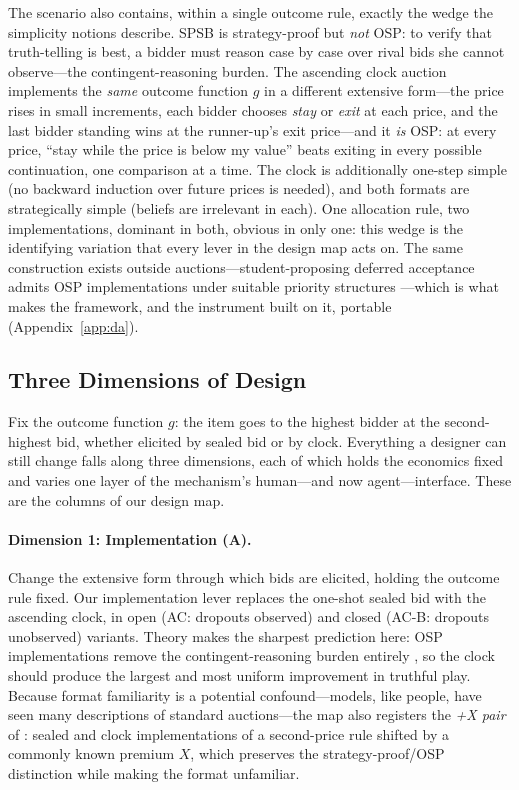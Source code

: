 The scenario also contains, within a single outcome rule, exactly the wedge the simplicity notions describe. SPSB is strategy-proof but \emph{not} OSP: to verify that truth-telling is best, a bidder must reason case by case over rival bids she cannot observe---the contingent-reasoning burden. The ascending clock auction implements the \emph{same} outcome function $g$ in a different extensive form---the price rises in small increments, each bidder chooses \emph{stay} or \emph{exit} at each price, and the last bidder standing wins at the runner-up's exit price---and it \emph{is} OSP: at every price, ``stay while the price is below my value'' beats exiting in every possible continuation, one comparison at a time. The clock is additionally one-step simple (no backward induction over future prices is needed), and both formats are strategically simple (beliefs are irrelevant in each). One allocation rule, two implementations, dominant in both, obvious in only one: this wedge is the identifying variation that every lever in the design map acts on. The same construction exists outside auctions---student-proposing deferred acceptance admits OSP implementations under suitable priority structures \citep{ashlagi2018stable}---which is what makes the framework, and the instrument built on it, portable (Appendix~\ref{app:da}).

\subsection{Three Dimensions of Design}\label{sec:theory-levers}

Fix the outcome function $g$: the item goes to the highest bidder at the second-highest bid, whether elicited by sealed bid or by clock. Everything a designer can still change falls along three dimensions, each of which holds the economics fixed and varies one layer of the mechanism's human---and now agent---interface. These are the columns of our design map.

\paragraph{Dimension 1: Implementation (A).}
Change the extensive form through which bids are elicited, holding the outcome rule fixed. Our implementation lever replaces the one-shot sealed bid with the ascending clock, in open (AC: dropouts observed) and closed (AC-B: dropouts unobserved) variants. Theory makes the sharpest prediction here: OSP implementations remove the contingent-reasoning burden entirely \citep{li2017obviously}, so the clock should produce the largest and most uniform improvement in truthful play. Because format familiarity is a potential confound---models, like people, have seen many descriptions of standard auctions---the map also registers the \emph{+X pair} of \citet{li2017obviously}: sealed and clock implementations of a second-price rule shifted by a commonly known premium $X$, which preserves the strategy-proof/OSP distinction while making the format unfamiliar. 

